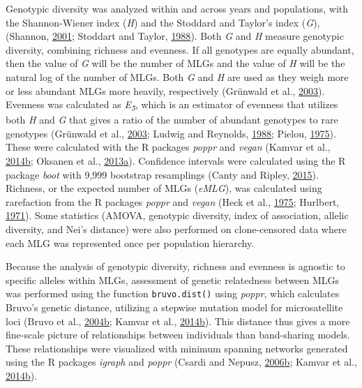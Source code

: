 \documentclass[double,12pt]{beavtex}
\begin{document}
  Genotypic diversity was analyzed within and across years and
  populations, with the Shannon-Wiener index (\emph{H}) and the Stoddard
  and Taylor's index (\emph{G}), (Shannon,
  \protect\hyperlink{ref-shannon2001mathematical}{2001}; Stoddart and
  Taylor, \protect\hyperlink{ref-stoddart1988genotypic}{1988}). Both
  \emph{G} and \emph{H} measure genotypic diversity, combining richness
  and evenness. If all genotypes are equally abundant, then the value of
  \emph{G} will be the number of MLGs and the value of \emph{H} will be
  the natural log of the number of MLGs. Both \emph{G} and \emph{H} are
  used as they weigh more or less abundant MLGs more heavily, respectively
  (Grünwald et al., \protect\hyperlink{ref-grunwald2003analysis}{2003}).
  Evenness was calculated as \emph{E\textsubscript{5}}, which is an
  estimator of evenness that utilizes both \emph{H} and \emph{G} that
  gives a ratio of the number of abundant genotypes to rare genotypes
  (Grünwald et al., \protect\hyperlink{ref-grunwald2003analysis}{2003};
  Ludwig and Reynolds,
  \protect\hyperlink{ref-ludwig1988statistical}{1988}; Pielou,
  \protect\hyperlink{ref-pielou1975ecological}{1975}). These were
  calculated with the R packages \emph{poppr} and \emph{vegan} (Kamvar et
  al.,
  \protect\hyperlink{ref-kamvar2014poppr}{2014}\protect\hyperlink{ref-kamvar2014poppr}{b};
  Oksanen et al.,
  \protect\hyperlink{ref-oksanen2013vegan}{2013}\protect\hyperlink{ref-oksanen2013vegan}{a}).
  Confidence intervals were calculated using the R package \emph{boot}
  with 9,999 bootstrap resamplings (Canty and Ripley,
  \protect\hyperlink{ref-canty2015boot}{2015}). Richness, or the expected
  number of MLGs (\emph{eMLG}), was calculated using rarefaction from the
  R packages \emph{poppr} and \emph{vegan} (Heck et al.,
  \protect\hyperlink{ref-heck1975explicit}{1975}; Hurlbert,
  \protect\hyperlink{ref-hurlbert1971nonconcept}{1971}). Some statistics
  (AMOVA, genotypic diversity, index of association, allelic diversity,
  and Nei's distance) were also performed on clone-censored data where
  each MLG was represented once per population hierarchy.
  
  Because the analysis of genotypic diversity, richness and evenness is
  agnostic to specific alleles within MLGs, assessment of genetic
  relatedness between MLGs was performed using the function
  \texttt{bruvo.dist()} using \emph{poppr}, which calculates Bruvo's
  genetic distance, utilizing a stepwise mutation model for microsatellite
  loci (Bruvo et al.,
  \protect\hyperlink{ref-bruvo2004simple}{2004}\protect\hyperlink{ref-bruvo2004simple}{b};
  Kamvar et al.,
  \protect\hyperlink{ref-kamvar2014poppr}{2014}\protect\hyperlink{ref-kamvar2014poppr}{b}).
  This distance thus gives a more fine-scale picture of relationships
  between individuals than band-sharing models. These relationships were
  visualized with minimum spanning networks generated using the R packages
  \emph{igraph} and \emph{poppr} (Csardi and Nepusz,
  \protect\hyperlink{ref-csardi2006igraph}{2006}\protect\hyperlink{ref-csardi2006igraph}{b};
  Kamvar et al.,
  \protect\hyperlink{ref-kamvar2014poppr}{2014}\protect\hyperlink{ref-kamvar2014poppr}{b}).
  
\end{document}
